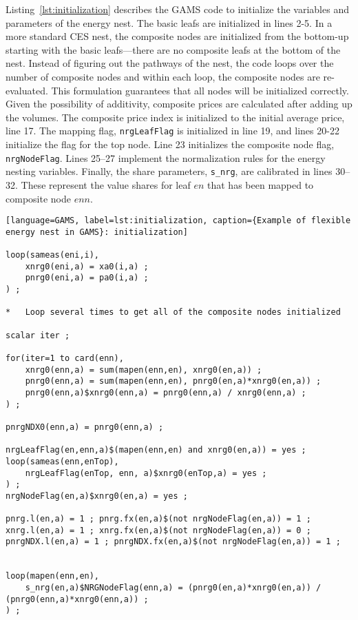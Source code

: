 Listing~\ref{lst:initialization} describes the GAMS code to initialize
the variables and parameters of the energy nest. The basic leafs are
initialized in lines 2-5. In a more standard CES nest, the composite nodes are
initialized from the bottom-up starting with the basic leafs---there
are no composite leafs at the bottom of the nest. Instead of figuring
out the pathways of the nest, the code loops over the number of composite nodes
and within each loop, the composite nodes are re-evaluated. This formulation
guarantees that all nodes will be initialized correctly. Given the possibility
of additivity, composite prices are calculated after adding up the volumes.
The composite price index is initialized to the initial average price, line 17.
The mapping flag, \texttt{nrgLeafFlag} is initialized in line 19, and lines 20-22 initialize
the flag for the top node. Line 23 initializes the composite node flag, \texttt{nrgNodeFlag}. Lines 25--27 implement the normalization rules for the
energy nesting variables. Finally, the share parameters, \texttt{s\_nrg}, are
calibrated in lines 30--32. These represent the value shares for leaf $\mathit{en}$
that has been mapped to composite node $\mathit{enn}$.

\begin{lstlisting}[language=GAMS, label=lst:initialization, caption={Example of flexible energy nest in GAMS}: initialization]

loop(sameas(eni,i),
    xnrg0(eni,a) = xa0(i,a) ;
    pnrg0(eni,a) = pa0(i,a) ;
) ;

*   Loop several times to get all of the composite nodes initialized

scalar iter ;

for(iter=1 to card(enn),
    xnrg0(enn,a) = sum(mapen(enn,en), xnrg0(en,a)) ;
    pnrg0(enn,a) = sum(mapen(enn,en), pnrg0(en,a)*xnrg0(en,a)) ;
    pnrg0(enn,a)$xnrg0(enn,a) = pnrg0(enn,a) / xnrg0(enn,a) ;
) ;

pnrgNDX0(enn,a) = pnrg0(enn,a) ;

nrgLeafFlag(en,enn,a)$(mapen(enn,en) and xnrg0(en,a)) = yes ;
loop(sameas(enn,enTop),
    nrgLeafFlag(enTop, enn, a)$xnrg0(enTop,a) = yes ;
) ;
nrgNodeFlag(en,a)$xnrg0(en,a) = yes ;

pnrg.l(en,a) = 1 ; pnrg.fx(en,a)$(not nrgNodeFlag(en,a)) = 1 ;
xnrg.l(en,a) = 1 ; xnrg.fx(en,a)$(not nrgNodeFlag(en,a)) = 0 ;
pnrgNDX.l(en,a) = 1 ; pnrgNDX.fx(en,a)$(not nrgNodeFlag(en,a)) = 1 ;


loop(mapen(enn,en),
    s_nrg(en,a)$NRGNodeFlag(enn,a) = (pnrg0(en,a)*xnrg0(en,a)) / (pnrg0(enn,a)*xnrg0(enn,a)) ;
) ;
\end{lstlisting}

